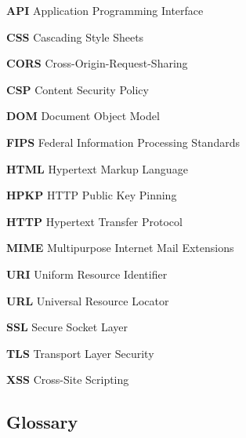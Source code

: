 \documentclass{mscreport}
\begin{document}
\noindent \textbf{API} Application Programming Interface \par
\vspace{0.5cm}
\noindent \textbf{CSS} Cascading Style Sheets \par
\noindent \textbf{CORS} Cross-Origin-Request-Sharing \par
\noindent \textbf{CSP} Content Security Policy \par
\vspace{0.5cm}
\noindent \textbf{DOM} Document Object Model \par
\vspace{0.5cm}
\noindent \textbf{FIPS} Federal Information Processing Standards \par
\vspace{0.5cm}
\noindent \textbf{HTML} Hypertext Markup Language \par
\noindent \textbf{HPKP} HTTP Public Key Pinning \par
\noindent \textbf{HTTP} Hypertext Transfer Protocol \par
\vspace{0.5cm}
\noindent \textbf{MIME} Multipurpose Internet Mail Extensions \par
\vspace{0.5cm}
\noindent \textbf{URI} Uniform Resource Identifier \par
\noindent \textbf{URL} Universal Resource Locator \par
\vspace{0.5cm}
\noindent \textbf{SSL} Secure Socket Layer \par
\vspace{0.5cm}
\noindent \textbf{TLS} Transport Layer Security \par
\vspace{0.5cm}
\noindent \textbf{XSS} Cross-Site Scripting \par

\newpage

\begin{center}
\section*{Glossary}
\end{center}
\end{document}
